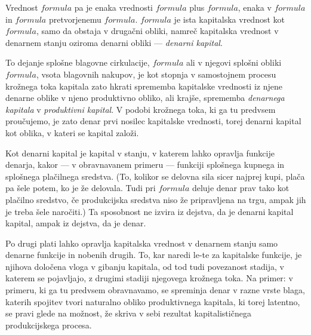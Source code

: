 \documentclass[kapital_02.tex]{subfiles}
\begin{document}
Vrednost \( formula \) pa je enaka vrednosti \( formula \) plus \( formula \), enaka v \( formula \) in \( formula \) pretvorjenemu \( formula \). \( formula \) je ista kapitalska vrednost kot \( formula \), samo da obstaja v drugačni obliki, namreč kapitalska vrednost v denarnem stanju oziroma denarni obliki --- \emph{denarni kapital}.

To dejanje splošne blagovne cirkulacije, \( formula \) ali v njegovi splošni obliki \( formula \), vsota blagovnih nakupov, je kot stopnja v samostojnem procesu krožnega toka kapitala zato hkrati sprememba kapitalske vrednosti iz njene denarne oblike v njeno produktivno obliko, ali krajše, sprememba \emph{denarnega kapitala} v \emph{produktivni kapital}. V podobi krožnega toka, ki ga tu predvsem proučujemo, je zato denar prvi nosilec kapitalske vrednosti, torej denarni kapital kot oblika, v kateri se kapital založi.

Kot denarni kapital je kapital v stanju, v katerem lahko opravlja funkcije denarja, kakor --- v obravnavanem primeru --- funkciji splošnega kupnega in splošnega plačilnega sredstva. (To, kolikor se delovna sila sicer najprej kupi, plača pa šele potem, ko je že delovala. Tudi pri \( formula \) deluje denar prav tako kot plačilno sredstvo, če produkcijska sredstva niso že pripravljena na trgu, ampak jih je treba šele naročiti.) Ta sposobnost ne izvira iz dejstva, da je denarni kapital kapital, ampak iz dejstva, da je denar.

Po drugi plati lahko opravlja kapitalska vrednost v denarnem stanju samo denarne funkcije in nobenih drugih. To, kar naredi le-te za kapitalske funkcije, je njihova določena vloga v gibanju kapitala, od tod tudi povezanost stadija, v katerem se pojavljajo, z drugimi stadiji njegovega krožnega toka. Na primer: v primeru, ki ga tu predvsem obravnavamo, se spreminja denar v razne vrste blaga, katerih spojitev tvori naturalno obliko produktivnega kapitala, ki torej latentno, se pravi glede na možnost, že skriva v sebi rezultat kapitalističnega produkcijskega procesa.
\end{document}
